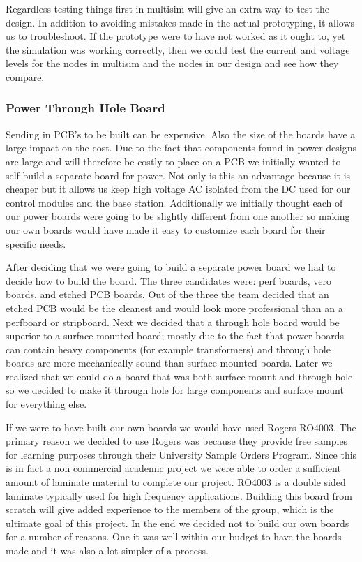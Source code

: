 Regardless testing things first in multisim will give an extra way to test the
design. In addition to avoiding mistakes made in the actual prototyping, it
allows us to troubleshoot. If the prototype were to have not worked as it ought to,
yet the simulation was working correctly, then we could test the current and
voltage levels for the nodes in multisim and the nodes in our design and see
how they compare.

\subsubsection{Power Through Hole Board}
\label{sec:power-through}
Sending in PCB{}'s to be built can be expensive. Also the size of the boards
have a large impact on the cost. Due to the fact that components found in power
designs are large and will therefore be costly to place on a PCB we initially wanted to
self build a separate board for power. Not only is this an advantage because it
is cheaper but it allows us keep high voltage AC isolated from the DC used for
our control modules and the base station. Additionally we initially thought each of our power boards
were going to be slightly different from one another so making our own boards would have made it
easy to customize each board for their specific needs.

After deciding that we were going to build a separate power board we had to decide how to
build the board. The three candidates were: perf boards, vero boards, and
etched PCB boards. Out of the three the team decided that an etched PCB would
be the cleanest and would look more professional than an a perfboard or
stripboard. Next we decided that a through hole board would be superior to a
surface mounted board; mostly due to the fact that power boards can contain
heavy components (for example transformers) and through hole boards are more
mechanically sound than surface mounted boards. Later we realized that we could do a board that was both surface mount and through hole so we decided to make it through hole for large components and surface mount for everything else.  

If we were to have built our own boards we would have used Rogers RO4003. The primary reason
we decided to use Rogers was because they provide free samples for learning
purposes through their University Sample Orders Program. Since this is in fact
a non commercial academic project we were able to order a sufficient amount of
laminate material to complete our project.  RO4003 is a double sided laminate
typically used for high frequency applications. Building this board from
scratch will give added experience to the members of the group, which is the
ultimate goal of this project. In the end we decided not to build our own boards for a number of reasons. One it was well within our budget to have the boards made and it was also a lot simpler of a process. 


